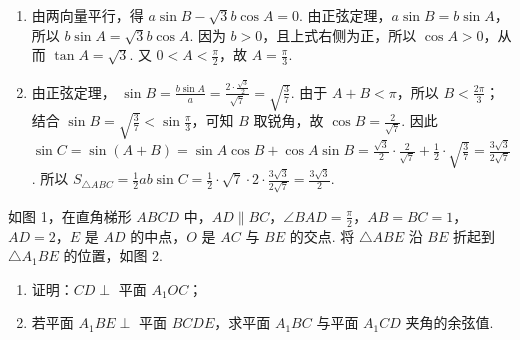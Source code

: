 \begin{solution}
\begin{enumerate}
\item 由两向量平行，得
\(a\sin B-\sqrt{3}b\cos A=0\).
由正弦定理，\(a\sin B=b\sin A\)，所以
\(b\sin A=\sqrt{3}b\cos A\). 因为 \(b>0\)，且上式右侧为正，所以 \(\cos A>0\)，从而
\(\tan A=\sqrt{3}\). 又 \(0<A<\frac{\pi}{2}\)，故 \(A=\frac{\pi}{3}\).

\item 由正弦定理，
\(\sin B=\frac{b\sin A}{a}=\frac{2\cdot\frac{\sqrt{3}}{2}}{\sqrt{7}}=\sqrt{\frac{3}{7}}\).
由于 \(A+B<\pi\)，所以 \(B<\frac{2\pi}{3}\)；结合 \(\sin B=\sqrt{\frac{3}{7}}<\sin\frac{\pi}{3}\)，可知 \(B\) 取锐角，故 \(\cos B=\frac{2}{\sqrt{7}}\). 因此
\(\sin C=\sin(A+B)=\sin A\cos B+\cos A\sin B=\frac{\sqrt{3}}{2}\cdot\frac{2}{\sqrt{7}}+\frac{1}{2}\cdot\sqrt{\frac{3}{7}}=\frac{3\sqrt{3}}{2\sqrt{7}}\).
所以
\(S_{\triangle ABC}=\frac{1}{2}ab\sin C=\frac{1}{2}\cdot\sqrt{7}\cdot2\cdot\frac{3\sqrt{3}}{2\sqrt{7}}=\frac{3\sqrt{3}}{2}\).
\end{enumerate}
\end{solution}

\begin{problem}
如图 1，在直角梯形 \(ABCD\) 中，\(AD \parallel BC\)，\(\angle BAD = \frac{\pi}{2}\)，\(AB = BC = 1\)，\(AD = 2\)，\(E\) 是 \(AD\) 的中点，\(O\) 是 \(AC\) 与 \(BE\) 的交点. 将 \(\triangle ABE\) 沿 \(BE\) 折起到 \(\triangle A_1BE\) 的位置，如图 2.

\begin{enumerate}
\item 证明：\(CD\perp\) 平面 \(A_{1}OC\)；
\item 若平面 \(A_{1}BE \perp\) 平面 \(BCDE\)，求平面 \(A_{1}BC\) 与平面 \(A_{1}CD\) 夹角的余弦值.
\end{enumerate}

\end{problem}

